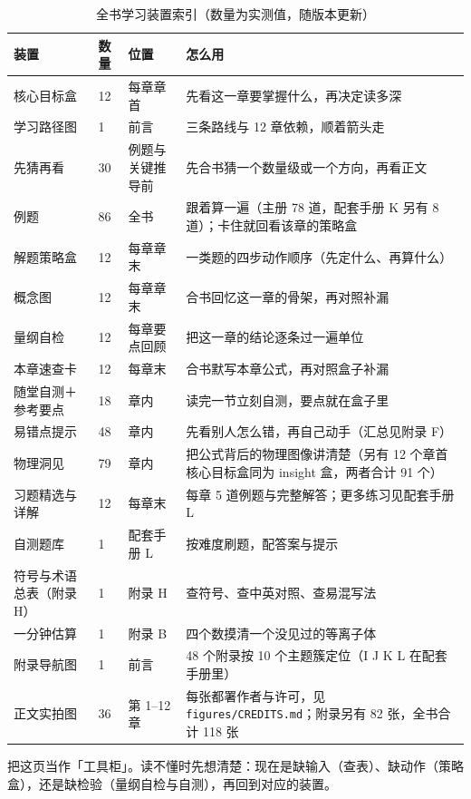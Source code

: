 \documentclass[12pt,a4paper,openany,oneside]{book}
\begin{document}
\begin{table}[htbp]
\centering
\caption{全书学习装置索引（数量为实测值，随版本更新）}
\label{tab:device-index}
\small
\begin{tabular}{@{}p{2.9cm}p{1.2cm}p{3.2cm}p{7.5cm}@{}}
\toprule
\textbf{装置} & \textbf{数量} & \textbf{位置} & \textbf{怎么用} \\
\midrule
核心目标盒 & 12 & 每章章首 & 先看这一章要掌握什么，再决定读多深 \\
学习路径图 & 1 & 前言 & 三条路线与 12 章依赖，顺着箭头走 \\
先猜再看 & 30 & 例题与关键推导前 & 先合书猜一个数量级或一个方向，再看正文 \\
例题 & 86 & 全书 & 跟着算一遍（主册 78 道，配套手册 K 另有 8 道）；卡住就回看该章的策略盒 \\
解题策略盒 & 12 & 每章章末 & 一类题的四步动作顺序（先定什么、再算什么） \\
概念图 & 12 & 每章章末 & 合书回忆这一章的骨架，再对照补漏 \\
量纲自检 & 12 & 每章要点回顾 & 把这一章的结论逐条过一遍单位 \\
本章速查卡 & 12 & 每章末 & 合书默写本章公式，再对照盒子补漏 \\
随堂自测＋参考要点 & 18 & 章内 & 读完一节立刻自测，要点就在盒子里 \\
易错点提示 & 48 & 章内 & 先看别人怎么错，再自己动手（汇总见附录 F） \\
物理洞见 & 79 & 章内 & 把公式背后的物理图像讲清楚（另有 12 个章首核心目标盒同为 insight 盒，两者合计 91 个） \\
习题精选与详解 & 12 & 每章末 & 每章 5 道例题与完整解答；更多练习见配套手册 L \\
自测题库 & 1 & 配套手册 L & 按难度刷题，配答案与提示 \\
符号与术语总表（附录 H） & 1 & 附录 H & 查符号、查中英对照、查易混写法 \\
一分钟估算 & 1 & 附录 B & 四个数摸清一个没见过的等离子体 \\
附录导航图 & 1 & 前言 & 48 个附录按 10 个主题簇定位（I J K L 在配套手册里） \\
正文实拍图 & 36 & 第 1--12 章 & 每张都署作者与许可，见 \texttt{figures/\allowbreak{}CREDITS.md}；附录另有 82 张，全书合计 118 张 \\
\bottomrule
\end{tabular}
\end{table}

把这页当作「工具柜」。读不懂时先想清楚：现在是缺输入（查表）、缺动作（策略盒），还是缺检验（量纲自检与自测），再回到对应的装置。
\end{document}
